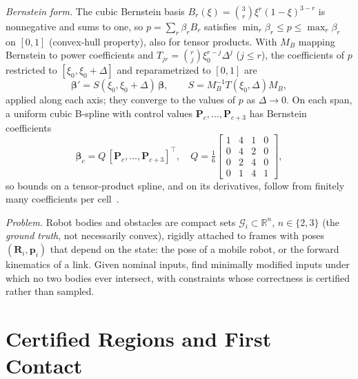 \documentclass[journal]{IEEEtran}
\theoremstyle{definition}
\newcommand{\R}{\mathbb{R}}
\newcommand{\Rot}{\mathbf{R}}
\begin{document}
\emph{Bernstein form.} The cubic Bernstein basis $B_r(\xi)=\binom3r\xi^r(1-\xi)^{3-r}$ is
nonnegative and sums to one, so $p=\sum_r\beta_rB_r$ satisfies $\min_r\beta_r\le p\le\max_r\beta_r$
on $[0,1]$ (convex-hull property), also for tensor products. With $M_B$ mapping Bernstein to power
coefficients and $T_{jr}=\binom rj\xi_0^{r-j}\Delta^j$ ($j\le r$), the coefficients of $p$ restricted
to $[\xi_0,\xi_0+\Delta]$ and reparametrized to $[0,1]$ are
\begin{equation}\label{eq:subdiv}
\boldsymbol\beta'=S(\xi_0,\xi_0+\Delta)\,\boldsymbol\beta,\qquad S=M_B^{-1}T(\xi_0,\Delta)M_B,
\end{equation}
applied along each axis; they converge to the values of $p$ as $\Delta\to0$. On each span, a uniform
cubic B-spline with control values $\mathbf P_c,\dots,\mathbf P_{c+3}$ has Bernstein coefficients
\begin{equation}\label{eq:b2b}
\boldsymbol\beta_c=Q\,[\mathbf P_{c},\dots,\mathbf P_{c+3}]^{\top},\quad
Q=\tfrac16\left[\begin{smallmatrix}1&4&1&0\\0&4&2&0\\0&2&4&0\\0&1&4&1\end{smallmatrix}\right],
\end{equation}
so bounds on a tensor-product spline, and on its derivatives, follow from finitely many
coefficients per cell~\cite{farin2002curves,jo2027semantic}.

\emph{Problem.} Robot bodies and obstacles are compact sets $\mathcal G_i\subset\R^n$, $n\in\{2,3\}$
(the \emph{ground truth}, not necessarily convex), rigidly attached to frames with poses
$(\Rot_i,\mathbf p_i)$ that depend on the state: the pose of a mobile robot, or the forward
kinematics of a link. Given nominal inputs, find minimally modified inputs under which no two
bodies ever intersect, with constraints whose correctness is certified rather than sampled.

\section{Certified Regions and First Contact}\label{sec:regions}
\end{document}
